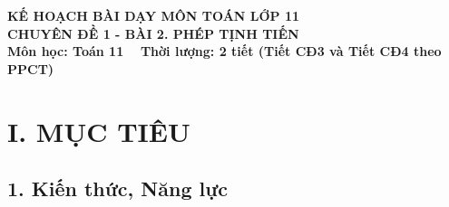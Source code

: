 \documentclass[12pt, a4paper]{article}
\begin{document}
  
  
\begin{center}  
    {\fontsize{14pt}{17pt}\selectfont \textbf{KẾ HOẠCH BÀI DẠY MÔN TOÁN LỚP 11}}\\[6pt]  
    {\fontsize{16pt}{19pt}\selectfont \textbf{CHUYÊN ĐỀ 1 - BÀI 2. PHÉP TỊNH TIẾN}}\\[4pt]  
    {\fontsize{12pt}{15pt}\selectfont \textbf{Môn học: Toán 11} \ \textbar \ \textbf{Thời lượng: 2 tiết (Tiết CĐ3 và Tiết CĐ4 theo PPCT)}}  
\end{center}  
  
\vspace{5pt}  
  
\section*{I. MỤC TIÊU}  
  
\subsection*{1. Kiến thức, Năng lực}  
  
\end{document}

